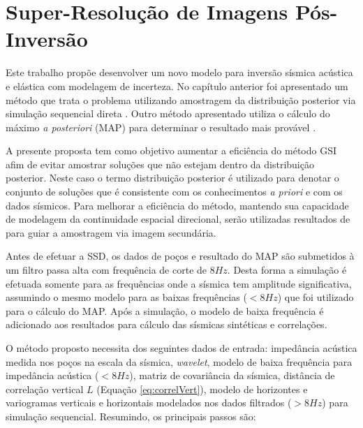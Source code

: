 \chapter{Super-Resolução de Imagens Pós-Inversão}
\label{cap:3modeloHibrido}

Este trabalho propõe desenvolver um novo modelo para inversão sísmica acústica e
elástica com modelagem de incerteza. No capítulo anterior foi apresentado um
método que trata o problema utilizando amostragem da distribuição posterior via
simulação sequencial direta \citep{amilcarInversao}. Outro método apresentado
utiliza o cálculo do máximo \textit{a posteriori} (MAP) para determinar o
resultado mais provável \citep{Buland01012003}.

A presente proposta tem como objetivo aumentar a eficiência do método GSI
\citep{amilcarInversao} afim de evitar amostrar soluções que não estejam dentro
da distribuição posterior. Neste caso o termo distribuição posterior é utilizado
para denotar o conjunto de soluções que é consistente com os conhecimentos
\textit{a priori} e com os dados sísmicos. Para melhorar a eficiência do método,
mantendo sua capacidade de modelagem da continuidade espacial direcional, serão
utilizadas resultados de \cite{Buland01012003} para guiar a amostragem via
imagem secundária.

Antes de efetuar a SSD, os dados de poços e resultado do MAP são submetidos à um
filtro passa alta com frequência de corte de $8Hz$. Desta forma a simulação é
efetuada somente para as frequências onde a sísmica tem amplitude significativa,
assumindo o mesmo modelo para as baixas frequências ($<8Hz$) que foi utilizado
para o cálculo do MAP. Após a simulação, o modelo de baixa frequência é
adicionado aos resultados para cálculo das sísmicas sintéticas e correlações.

O método proposto necessita dos seguintes dados de entrada: impedância acústica
medida nos poços na escala da sísmica, \textit{wavelet}, modelo de baixa
frequência para impedância acústica ($<8Hz$), matriz de covariância da sísmica,
distância de correlação vertical $L$ (Equação \ref{eq:correlVert}), modelo de
horizontes e variogramas verticais e horizontais modelados nos dados filtrados
($>8Hz$) para simulação sequencial. Resumindo, os principais passos são:


